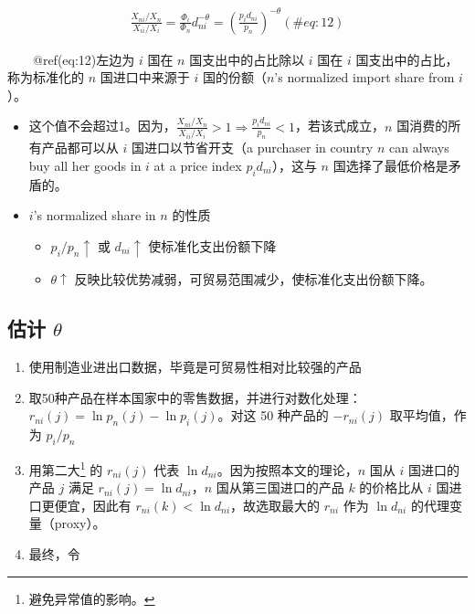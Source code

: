 \documentclass[]{tufte-handout}
\providecommand{\tightlist}{%
  \setlength{\itemsep}{0pt}\setlength{\parskip}{0pt}}
\begin{document}
\begin{align}
\frac{X_{n i} / X_{n}}{X_{i i} / X_{i}}=\frac{\Phi_{i}}{\Phi_{n}} d_{n i}^{-\theta}=\left(\frac{p_{i} d_{n i}}{p_{n}}\right)^{-\theta} (\#eq:12)
\end{align}

　　@ref(eq:12)左边为 \(i\) 国在 \(n\) 国支出中的占比除以 \(i\) 国在
\(i\) 国支出中的占比，称为标准化的 \(n\) 国进口中来源于 \(i\)
国的份额（\(n\)'s normalized import share from \(i\)）。

\begin{itemize}
\tightlist
\item
  这个值不会超过1。因为，\(\frac{X_{n i} / X_{n}}{X_{i i} / X_{i}}>1 \Rightarrow \frac{p_{i} d_{n i}}{p_{n}}<1\)，若该式成立，\(n\)
  国消费的所有产品都可以从 \(i\) 国进口以节省开支（a purchaser in
  country \(n\) can always buy all her goods in \(i\) at a price index
  \(p_{i} d_{n i}\)），这与 \(n\) 国选择了最低价格是矛盾的。\\
\item
  \(i\)'s normalized share in \(n\) 的性质

  \begin{itemize}
  \tightlist
  \item
    \(p_i/p_n \uparrow\) 或 \(d_{ni} \uparrow\) 使标准化支出份额下降\\
  \item
    \(\theta \uparrow\)
    反映比较优势减弱，可贸易范围减少，使标准化支出份额下降。
  \end{itemize}
\end{itemize}

\hypertarget{ux4f30ux8ba1-theta}{%
\subsection{\texorpdfstring{估计
\(\theta\)}{估计 \textbackslash theta}}\label{ux4f30ux8ba1-theta}}

\begin{enumerate}
\def\labelenumi{\arabic{enumi}.}
\tightlist
\item
  使用制造业进出口数据，毕竟是可贸易性相对比较强的产品\\
\item
  取50种产品在样本国家中的零售数据，并进行对数化处理：\(r_{n i}(j)=\ln p_{n}(j)-\ln p_{i}(j)\)。对这
  50 种产品的 \(-r_{n i}(j)\) 取平均值，作为 \(p_i/p_n\)\\
\item
  用第二大\footnote{避免异常值的影响。} 的 \(r_{n i}(j)\) 代表
  \(\ln d_{ni}\)。因为按照本文的理论，\(n\) 国从 \(i\) 国进口的产品
  \(j\) 满足 \(r_{n i}(j)=\ln d_{ni}\)，\(n\) 国从第三国进口的产品 \(k\)
  的价格比从 \(i\) 国进口更便宜，因此有
  \(r_{n i}(k)<\ln d_{ni}\)，故选取最大的 \(r_{n i}\) 作为
  \(\ln d_{ni}\) 的代理变量（proxy）。
\item
  最终，令
\end{enumerate}
\end{document}
